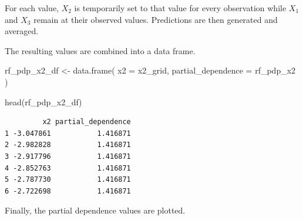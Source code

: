 \documentclass[
  letterpaper,
  DIV=11,
  numbers=noendperiod]{scrreprt}
\newenvironment{Shaded}{\begin{snugshade}}{\end{snugshade}}
\newcommand{\AttributeTok}[1]{\textcolor[rgb]{0.40,0.45,0.13}{#1}}
\newcommand{\ControlFlowTok}[1]{\textcolor[rgb]{0.00,0.23,0.31}{\textbf{#1}}}
\newcommand{\FunctionTok}[1]{\textcolor[rgb]{0.28,0.35,0.67}{#1}}
\newcommand{\NormalTok}[1]{\textcolor[rgb]{0.00,0.23,0.31}{#1}}
\newcommand{\OtherTok}[1]{\textcolor[rgb]{0.00,0.23,0.31}{#1}}
\newcommand{\SpecialCharTok}[1]{\textcolor[rgb]{0.37,0.37,0.37}{#1}}
\begin{document}
For each value, \(X_2\) is temporarily set to that value for every
observation while \(X_1\) and \(X_3\) remain at their observed values.
Predictions are then generated and averaged.

\begin{Shaded}
\end{Shaded}

The resulting values are combined into a data frame.

\begin{Shaded}
\begin{Highlighting}[]
\NormalTok{rf\_pdp\_x2\_df }\OtherTok{\textless{}{-}} \FunctionTok{data.frame}\NormalTok{(}
  \AttributeTok{x2 =}\NormalTok{ x2\_grid,}
  \AttributeTok{partial\_dependence =}\NormalTok{ rf\_pdp\_x2}
\NormalTok{)}

\FunctionTok{head}\NormalTok{(rf\_pdp\_x2\_df)}
\end{Highlighting}
\end{Shaded}

\begin{verbatim}
         x2 partial_dependence
1 -3.047861           1.416871
2 -2.982828           1.416871
3 -2.917796           1.416871
4 -2.852763           1.416871
5 -2.787730           1.416871
6 -2.722698           1.416871
\end{verbatim}

Finally, the partial dependence values are plotted.
\end{document}
